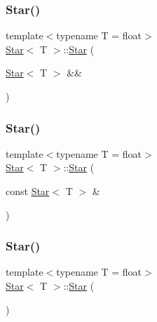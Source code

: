 \subsubsection{\texorpdfstring{Star()}{Star()}\hspace{0.1cm}{\footnotesize\ttfamily [3/8]}}
{\footnotesize\ttfamily template$<$typename T  = float$>$ \\
\mbox{\hyperlink{classStar}{Star}}$<$ T $>$\+::\mbox{\hyperlink{classStar}{Star}} (\begin{DoxyParamCaption}\item[{\mbox{\hyperlink{classStar}{Star}}$<$ T $>$ \&\&}]{ }\end{DoxyParamCaption})\hspace{0.3cm}{\ttfamily [default]}}

\mbox{\label{classStar_a047ce2a8d4fb409858555aee98b33c93}} 
\subsubsection{\texorpdfstring{Star()}{Star()}\hspace{0.1cm}{\footnotesize\ttfamily [4/8]}}
{\footnotesize\ttfamily template$<$typename T  = float$>$ \\
\mbox{\hyperlink{classStar}{Star}}$<$ T $>$\+::\mbox{\hyperlink{classStar}{Star}} (\begin{DoxyParamCaption}\item[{const \mbox{\hyperlink{classStar}{Star}}$<$ T $>$ \&}]{ }\end{DoxyParamCaption})\hspace{0.3cm}{\ttfamily [default]}}

\mbox{\label{classStar_a4be07c82320f781071409294614df4ae}} 
\subsubsection{\texorpdfstring{Star()}{Star()}\hspace{0.1cm}{\footnotesize\ttfamily [5/8]}}
{\footnotesize\ttfamily template$<$typename T  = float$>$ \\
\mbox{\hyperlink{classStar}{Star}}$<$ T $>$\+::\mbox{\hyperlink{classStar}{Star}} (\begin{DoxyParamCaption}{ }\end{DoxyParamCaption})}

